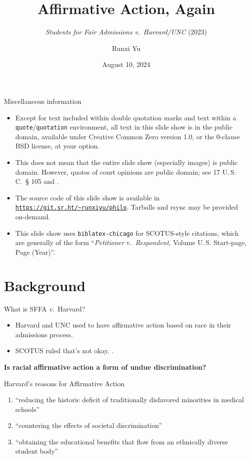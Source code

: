 \documentclass[parskip=half-]{scrartcl}
\title{Affirmative Action, Again}
\subtitle{\textit{Students for Fair Admissions \textup{v.}\ Harvard/UNC} (2023)}
\author{Runxi Yu}
\date{August 10, 2024}
\begin{document}
\maketitle


\begin{frame}[fragile]{Miscellaneous information}
\begin{itemize}
	\item Except for text included within double quotation marks and text within a \verb|quote|/\verb|quotation| environment, all text in this slide show is in the public domain, available under Creative Common Zero version 1.0, or the 0-clause BSD license, at your option.
	\item This does not mean that the entire slide show (especially images) is public domain. However, quotes of court opinions are public domain; see 17 U.\,S.\,C.\ {\S} 105 and .
	\item The source code of this slide show is available in \href{https://git.sr.ht/~runxiyu/philo}{\texttt{https://git.sr.ht/\~{}runxiyu/philo}}. Tarballs and rsync may be provided on-demand.
	\item This slide show uses \texttt{biblatex-chicago} for SCOTUS-style citations, which are generally of the form ``\textit{Petitioner} v.\ \textit{Respondent}, Volume U.\,S. Start-page, Page (Year)''.
\end{itemize}
\end{frame}

\section{Background}

\begin{frame}{What is SFFA \textit{v.}\ Harvard?}
\begin{itemize}
	\item Harvard and UNC used to have affirmative action based on race in their admissions process.
	\item SCOTUS ruled that's not okay. .
\end{itemize}\pause
\begin{center}\bfseries
	Is racial affirmative action a form of undue discrimination?
\end{center}
\end{frame}

\begin{frame}{Harvard's reasons for Affirmative Action}
\begin{enumerate}
	\item ``reducing the historic deficit of traditionally disfavored minorities in medical schools''
	\item ``countering the effects of societal discrimination''
	\item ``obtaining the educational benefits that flow from an ethnically diverse student body''
\end{enumerate}
\end{frame}
\end{document}
